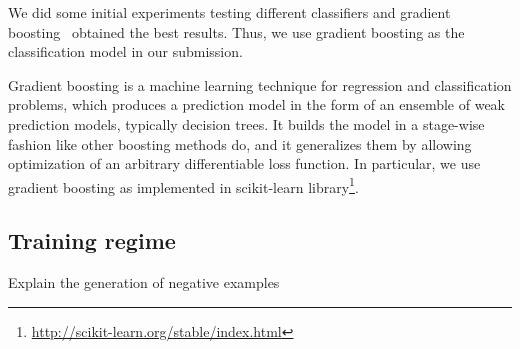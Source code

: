 We did some initial experiments testing different classifiers and gradient boosting~\cite{Friedman02} obtained the best results. Thus, we use gradient boosting as the classification model in our submission.

Gradient boosting is a machine learning technique for regression and classification problems, which produces a prediction model in the form of an ensemble of weak prediction models, typically decision trees. It builds the model in a stage-wise fashion like other boosting methods do, and it generalizes them by allowing optimization of an arbitrary differentiable loss function. In particular, we use gradient boosting as implemented in scikit-learn library\footnote{\url{http://scikit-learn.org/stable/index.html}}.




\subsection{Training regime}
\label{ssec:training}

Explain the generation of negative examples
\cite{Hainan17}
